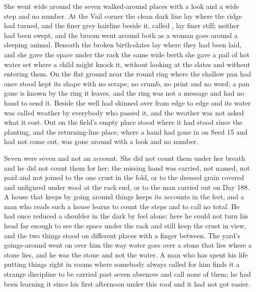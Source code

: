 \scenebreak

She went wide around the seven walked-around places with a look and a wide step and no number. At the Vail corner the clean dark line lay where the  ridge had turned, and the finer grey hairline beside it, called , lay finer still; neither had been swept, and the broom went around both as a woman goes around a sleeping animal. Beneath  the broken birth-slates lay where they had been laid, and she gave the space under the rack the same wide berth she gave a pail of hot water set where a child might knock it, without looking at the slates and without entering them. On the flat ground near  the round ring where the shallow pan had once stood kept its shape with no scrape, no crumb, no print and no word; a pan gone is known by the ring it leaves, and the ring was not a message and had no hand to send it. Beside the well  had skinned over from edge to edge and its water was called weather by everybody who passed it, and the weather was not asked what it cost. Out on  the field's empty place stood where it had stood since the planting, and the returning-line place, where a hand had gone in on Seed 15 and had not come out, was gone around with a look and no number.

Seven were seven and not an account. She did not count them under her breath and he did not count them for her; the missing hand was carried, not named, not paid and not joined to the one crust in the fold, or to the dressed grain covered and unfigured under wool at the rack end, or to the man carried out on Day 188. A house that keeps by going around things keeps its accounts in the feet, and a man who reads such a house learns to count the steps and to call no total. He had once reduced a shoulder in the dark by feel alone; here he could not turn his head far enough to see the space under the rack and still keep the crust in view, and the two things stood on different places with a finger between. The yard's goings-around went on over him the way water goes over a stone that lies where a stone lies, and he was the stone and not the water. A man who has spent his life putting things right in rooms where somebody always called for him finds it a strange discipline to be carried past seven absences and call none of them; he had been learning it since his first afternoon under this roof and it had not got easier.

\scenebreak

